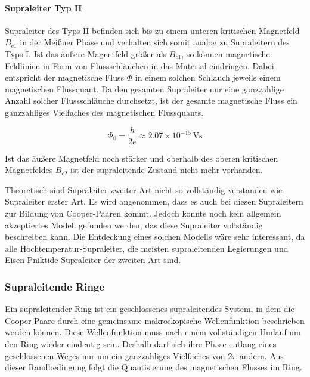 \documentclass{article}
\begin{document}
\paragraph{Supraleiter Typ II}

Supraleiter des Typs II befinden sich bis zu einem unteren kritischen Magnetfeld $B_{c1}$ in der Meißner Phase und verhalten sich somit analog zu Supraleitern des Typs I. Ist das äußere Magnetfeld größer als $B_{c1}$, so können magnetische Feldlinien in Form von Flussschläuchen in das Material eindringen. Dabei entspricht der magnetische Fluss $\Phi$ in einem solchen Schlauch jeweils einem magnetischen Flussquant. \cite{fprak_manual} \cite{wiki-superconducter}
Da den gesamten Supraleiter nur eine ganzzahlige Anzahl solcher Flussschläuche durchsetzt, ist der gesamte magnetische Fluss ein ganzzahliges Vielfaches des magnetischen Flussquants.

\begin{equation}
    \Phi_0 = \frac{h}{2e} \approx 2.07 \times 10^{-15}\,\mathrm{Vs}
\end{equation}

Ist das äußere Magnetfeld noch stärker und oberhalb des oberen kritischen Magnetfeldes $B_{c2}$ ist der supraleitende Zustand nicht mehr vorhanden.

Theoretisch sind Supraleiter zweiter Art nicht so vollständig verstanden wie Supraleiter erster Art. Es wird angenommen, dass es auch bei diesen Supraleitern zur Bildung von Cooper-Paaren kommt. Jedoch konnte noch kein allgemein akzeptiertes Modell gefunden werden, das diese Supraleiter vollständig beschreiben kann. Die Entdeckung eines solchen Modells wäre sehr interessant, da alle Hochtemperatur-Supraleiter, die meisten supraleitenden Legierungen und Eisen-Pniktide Supraleiter der zweiten Art sind.


\subsubsection{Supraleitende Ringe}

Ein supraleitender Ring ist ein geschlossenes supraleitendes System, in dem die Cooper-Paare durch eine gemeinsame makroskopische Wellenfunktion beschrieben werden können. Diese Wellenfunktion muss nach einem vollständigen Umlauf um den Ring wieder eindeutig sein. Deshalb darf sich ihre Phase entlang eines geschlossenen Weges nur um ein ganzzahliges Vielfaches von $2\pi$ ändern. Aus dieser Randbedingung folgt die Quantisierung des magnetischen Flusses im Ring.
\end{document}
